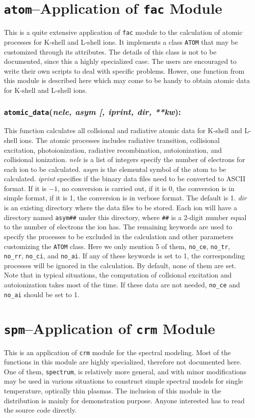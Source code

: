 \documentclass[twoside,letterpaper]{refrep}
\newcommand{\opt}[1]{
  {\textnormal{[}}{#1}\hspace{0.5mm}{\textnormal{]}}}
\newcommand{\var}[1]{\textit{#1}}
\newcommand{\key}[1]{\texttt{#1}}
\newcommand{\mod}[1]{\texttt{#1}}
\newenvironment{fundesc}[2]{
	\begin{center}
	\begin{minipage}{\textwidth}
	\subsubsection*{\key{\textbf{#1}}(\var{#2}):}
	\index{#1}
	\addcontentsline{toc}{subsubsection}{#1}}
	{\end{minipage}\end{center}}
\begin{document}
\section{\mod{atom}--Application of \mod{fac} Module}
\label{sec:atom}
This is a quite extensive application of \mod{fac} module to the
calculation of atomic processes for K-shell and L-shell ions. It implements a
class \key{ATOM} that may be customized through its attributes. The details of
this class is not to be documented, since this a highly specialized case. The
users are encouraged to write their own scripts to deal with specific
problems. Hower, one function from this module is described here which may
come to be handy to obtain atomic data for K-shell and L-shell ions.
\begin{fundesc}{atomic\_data}{nele, asym\opt{, iprint, dir, \textnormal{**}kw}}
This function calculates all collsional and radiative atomic data for K-shell
and L-shell ions. The atomic processes includes radiative transition,
collisional excitation, photoionization, radiative recombination,
autoionization, and collisional ionization. \var{nele} is a list of integers
specify the number of electrons for each ion to be calculated. \var{asym} is
the elemental symbol of the atom to be calculated. \var{iprint} specifies if
the binary data files need to be converted to ASCII format. If it is $-1$, no
conversion is carried out, if it is 0, the conversion is in simple format,
if it is 1, the conversion is in verbose format. The default is 1. \var{dir}
is an existing directory where the data files to be stored. Each ion will have
a directory named \key{asym\#\#} under this directory, where \key{\#\#} is a
2-digit number equal to the number of electrons the ion has. The remaining
keywords are used to specify the processes to be excluded in the calculation
and other parameters customizing the \key{ATOM} class. Here we only mention 5
of them, \key{no\_ce}, \key{no\_tr}, \key{no\_rr}, \key{no\_ci}, and
\key{no\_ai}. If any of these keywords is set to 1, the corresponding processes
will be ignored in the calculation. By default, none of them are set. Note
that in typical situations, the computation of collsional excitation and
autoionization takes most of the time. If these data are not needed,
\key{no\_ce} and \key{no\_ai} should be set to 1.
\end{fundesc}

\section{\mod{spm}--Application of \mod{crm} Module}
\label{sec:spm}
This is an application of \mod{crm} module for the spectral modeling. Most of
the functions in this module are highly specialized, therefore not documented
here. One of them, \key{spectrum}, is relatively more general, and with minor
modifications may be used in various situations to construct simple spectral
models for single temperature, optically thin plasmas. The inclusion of this
module in the distribution is mainly for demonstration purpose. Anyone
interested has to read the source code directly.
\end{document}
